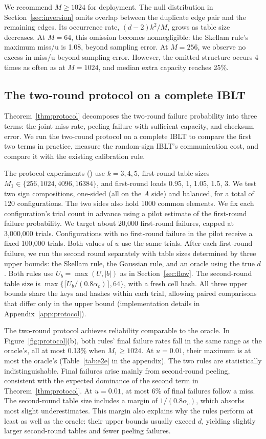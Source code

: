 We recommend $M\ge1024$ for deployment. The null distribution in Section~\ref{sec:inversion} omits overlap between the duplicate edge pair and the remaining edges. Its occurrence rate, $(d-2)k^2/M$, grows as table size decreases. At $M=64$, this omission becomes nonnegligible: the Skellam rule's maximum miss/u is 1.08, beyond sampling error. At $M=256$, we observe no excess in miss/u beyond sampling error. However, the omitted structure occurs 4 times as often as at $M=1024$, and median extra capacity reaches 25\%.

\subsection{The two-round protocol on a complete IBLT}\label{sec:exp-e2e}
Theorem~\ref{thm:protocol} decomposes the two-round failure probability into three terms: the joint miss rate, peeling failure with sufficient capacity, and checksum error. We run the two-round protocol on a complete IBLT to compare the first two terms in practice, measure the random-sign IBLT's communication cost, and compare it with the existing calibration rule.

The protocol experiments () use $k=3,4,5$, first-round table sizes $M_1\in\{256,1024,4096,16384\}$, and first-round loads 0.95, 1, 1.05, 1.5, 3. We test two sign compositions, one-sided (all on the $A$ side) and balanced, for a total of 120 configurations. The two sides also hold 1000 common elements. We fix each configuration's trial count in advance using a pilot estimate of the first-round failure probability. We target about 20,000 first-round failures, capped at 3,000,000 trials. Configurations with no first-round failure in the pilot receive a fixed 100,000 trials. Both values of $u$ use the same trials. After each first-round failure, we run the second round separately with table sizes determined by three upper bounds: the Skellam rule, the Gaussian rule, and an oracle using the true $d$. Both rules use $U_b=\max(U,|b|)$ as in Section~\ref{sec:flow}. The second-round table size is $\max\{\lceil U_b/(0.8\alpha_c)\rceil,64\}$, with a fresh cell hash. All three upper bounds share the keys and hashes within each trial, allowing paired comparisons that differ only in the upper bound (implementation details in Appendix~\ref{app:protocol}).

The two-round protocol achieves reliability comparable to the oracle. In Figure~\ref{fig:protocol}(b), both rules' final failure rates fall in the same range as the oracle's, all at most 0.13\% when $M_1\ge1024$. At $u=0.01$, their maximum is at most the oracle's (Table~\ref{tab:e2e} in the appendix). The two rules are statistically indistinguishable. Final failures arise mainly from second-round peeling, consistent with the expected dominance of the second term in Theorem~\ref{thm:protocol}. At $u=0.01$, at most 6\% of final failures follow a miss. The second-round table size includes a margin of $1/(0.8\alpha_c)$, which absorbs most slight underestimates. This margin also explains why the rules perform at least as well as the oracle: their upper bounds usually exceed $d$, yielding slightly larger second-round tables and fewer peeling failures.


